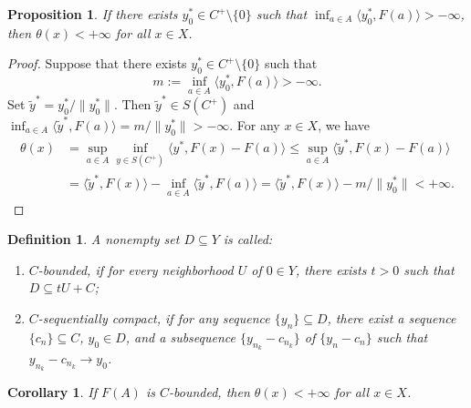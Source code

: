 \documentclass[10pt,a4paper]{amsart}
\newtheorem{definition}{Definition}[section]
\newtheorem{corollary}{Corollary}[section]
\newtheorem{proposition}{Proposition}[section]
\begin{document}
\begin{proposition}\label{AQWE}
	If there exists    $y_0^*\in C^+\setminus\{0\}$ such that $\inf_{a\in A}\langle y_0^*,F(a)\rangle > -\infty$, then $\theta(x)<+\infty$ for all $x\in X$.
\end{proposition}
\begin{proof}
	Suppose  that  there exists $y_0^*\in C^+\setminus\{0\}$ such that
	\[
	m:=\inf_{a\in A}\langle y_0^*,F(a)\rangle > -\infty.
	\]
	Set $\tilde y^*=y_0^*/\|y_0^*\|$.  Then $\tilde y^*\in S(C^+)$ and $\inf_{a\in A}\langle\tilde y^*,F(a)\rangle = m/\|y_0^*\| > -\infty$.   For any $x\in X$, we have
	\[
	\begin{aligned}
		\theta(x) &= \sup_{a \in A} \inf_{y \in S(C^+)} \langle y^*, F(x) - F(a) \rangle  
		\leq \sup_{a \in A} \langle \tilde y^*, F(x) - F(a) \rangle \\
		&= \langle \tilde y^*, F(x) \rangle - \inf_{a \in A} \langle \tilde y^*, F(a) \rangle  
		= \langle \tilde y^*, F(x) \rangle - m/\|y_0^*\| < + \infty.
	\end{aligned}
	\]
\end{proof}

\begin{definition}  	\cite{Luc, DF2024} 
	A nonempty set $D \subseteq Y$ is called:
	\begin{enumerate}
		\item[(i)] $C$-bounded, if for every neighborhood $U$ of $0 \in Y$, there exists $t > 0$ such that $D \subseteq tU + C$;
		\item[(ii)] $C$-sequentially compact, if for any sequence $\{y_n\}  \subseteq D$, there exist a sequence $\{c_n\}  \subseteq C$, $y_0 \in D$, and a subsequence $\{y_{n_k} - c_{n_k}\} $ of $\{y_n - c_n\} $ such that $y_{n_k} - c_{n_k} \to y_0$.
	\end{enumerate}
\end{definition}

\begin{corollary} \label{ZRUQ}
	If $F(A)$ is $C$-bounded, then $\theta(x)<+\infty$ for all $x\in X$.
\end{corollary}
\end{document}
